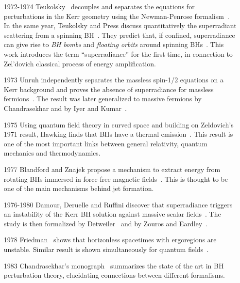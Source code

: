 \documentclass[11pt]{article}
\numberwithin{equation}{section} %
\begin{document}
\begin{itemize}[noitemsep]
 \item[1972-1974] Teukolsky~\cite{Teukolsky:1972my} decouples and
separates the equations for perturbations in the Kerr geometry using the
Newman-Penrose formalism~\cite{Newman:1961qr}. In the same year, Teukolsky and Press discuss quantitatively the superradiant scattering from a spinning BH~\cite{Teukolsky:1974yv}. They predict that, if confined, superradiance can give rise to \emph{BH bombs} and \emph{floating orbits} around spinning BHs~\cite{Press:1972zz}. This work introduces the term ``superradiance'' for the first time, in connection to Zel'dovich classical process of energy amplification.

\item[1973] Unruh independently separates the massless spin-1/2 equations on a Kerr background and proves the absence of superradiance for massless fermions~\cite{Unruh:1973,Toth:2015cda}. The result was later generalized to massive fermions by Chandrasekhar and by Iyer and Kumar~\cite{Chandra:1976,Iyer:1978,Dolan:2015eua}. 

\item[1975] Using quantum field theory in curved space and building on Zeldovich's 1971 result, Hawking
finds that BHs have a thermal emission~\cite{Hawking:1974sw}. This result is one
of the most important links between general relativity, quantum mechanics and thermodynamics.

\item[1977] Blandford and Znajek propose a mechanism to extract energy from rotating BHs immersed in force-free magnetic fields~\cite{Blandford:1977ds}.
This is thought to be one of the main mechanisms behind jet formation.

\item[1976-1980] Damour, Deruelle and Ruffini discover that superradiance triggers an instability of the Kerr BH solution against massive scalar fields~\cite{Damour:1976kh}. The study is then formalized by Detweiler~\cite{Detweiler:1980uk} and by Zouros and Eardley~\cite{Zouros:1979iw}. 
 
\item[1978] Friedman~\cite{1978CMaPh..63..243F} shows that horizonless spacetimes with ergoregions
are unstable. Similar result is shown simultaneously for quantum fields~\cite{Sato:1978ue}.

\item[1983] Chandrasekhar's monograph~\cite{Chandra} summarizes the
state of the art in BH perturbation theory, elucidating connections between
different formalisms.


\end{itemize}
\end{document}
